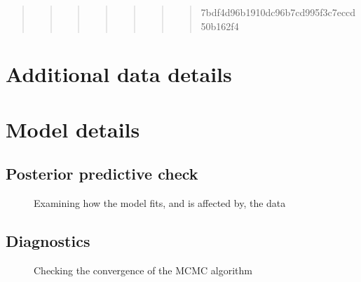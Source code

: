 \documentclass[
  letterpaper,
  DIV=11,
  numbers=noendperiod]{scrartcl}
\begin{document}
\begin{quote}
\begin{quote}
\begin{quote}
\begin{quote}
\begin{quote}
\begin{quote}
\begin{quote}
7bdf4d96b1910dc96b7cd995f3c7eccd50b162f4
\end{quote}
\end{quote}
\end{quote}
\end{quote}
\end{quote}
\end{quote}
\end{quote}

\section{Additional data details}\label{additional-data-details}

\section{Model details}\label{sec-model-details}

\subsection{Posterior predictive
check}\label{posterior-predictive-check}

\begin{figure}

\begin{minipage}{0.50\linewidth}
Examining how the model fits, and is affected by, the
data\end{minipage}%

\end{figure}%

\subsection{Diagnostics}\label{diagnostics}

\begin{figure}

\begin{minipage}{0.50\linewidth}
Checking the convergence of the MCMC algorithm\end{minipage}%

\end{figure}%
\end{document}

